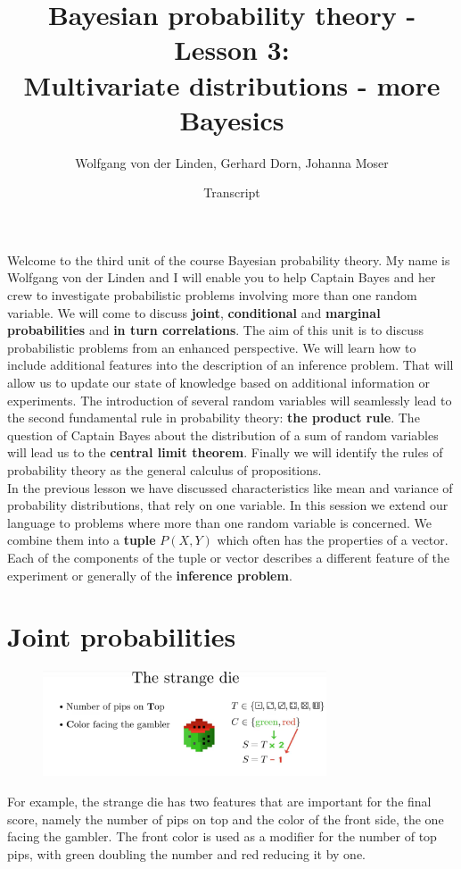 \documentclass[12pt, a4paper]{scrartcl}
\title{Bayesian probability theory - Lesson 3:\\
Multivariate distributions - more Bayesics}
\author{Wolfgang von der Linden, Gerhard Dorn, Johanna Moser}
\date{Transcript}
\begin{document}
\setlength{\parindent}{0pt}
\maketitle
\onehalfspacing

Welcome to the third unit of the course Bayesian probability theory. 
My name is Wolfgang von der Linden and I will enable you to help 
Captain Bayes and her crew to investigate probabilistic problems involving more than one random variable. We will come to discuss \textbf{joint}, \textbf{conditional} and \textbf{marginal probabilities} and \textbf{in turn correlations}.
The aim of this unit is to discuss probabilistic problems from an enhanced perspective. 
We will learn how to include additional features into the description of an inference problem. 
That will allow us to update our state of knowledge based on additional information or experiments.
The introduction of several random variables will seamlessly lead to the second fundamental rule in probability theory: \textbf{the product rule}.
The question of Captain Bayes about the distribution of a sum of random variables will lead us to the \textbf{central limit theorem}.
Finally we will identify the rules of probability theory as the general calculus of propositions.\\


In the previous lesson we have discussed characteristics like mean and variance of probability distributions, that rely on one variable.
In this session we extend our language to problems where more than one random variable is concerned. We combine them into a \textbf{tuple} $P(X,Y)$  which often has the properties of a vector. Each of the components of the tuple or vector describes a different feature of the experiment or generally of the \textbf{inference problem}.
\section*{Joint probabilities}
\begin{figure}[H]
	\centering
	\includegraphics[width=0.75\textwidth]{3_1.png}
\end{figure}
For example, the strange die has two features that are important for the final score, namely the number of pips on top and the color of the front side, the one facing the gambler.
The front color is used as a modifier for the number of top pips, with green doubling the number and red reducing it by one.\\
\end{document}
